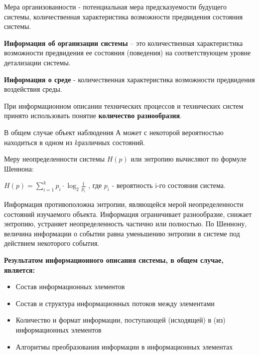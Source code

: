 \documentclass[a4paper]{article}
\begin{document}
Мера организованности - потенциальная мера предсказуемости будущего системы, количественная характеристика возможности предвидения состояния системы. 

\textbf{Информация об организации системы} – это количественная характеристика возможности предвидения ее состояния (поведения) на соответствующем уровне детализации системы.

\textbf{Информация о среде} - количественная характеристика возможности предвидения воздействия среды.


При информационном описании технических процессов и технических систем принято использовать понятие \textbf{количество разнообразия}.

В общем случае объект наблюдения  $ А $ может с некоторой вероятностью находиться в одном из $ k  $различных состояний.

Меру неопределенности системы $ H(p) $ или энтропию вычисляют по формуле Шеннона:

$ H(p) = \sum_{i=1}^{k}p_i \cdot \log_2 \frac{1}{p_i}$ , где $ p_i $ - вероятность i-го состояния система. 

Информация противоположна энтропии, являющейся мерой неопределенности состояний изучаемого объекта. Информация ограничивает разнообразие, снижает энтропию, устраняет неопределенность частично или полностью. По Шеннону, величина информации о событии равна уменьшению энтропии в системе под действием некоторого события.

\textbf{Результатом информационного описания системы, в общем случае, является:}
\begin{itemize}
	\item Состав информационных элементов
	\item Состав и структура информационных потоков между элементами
	\item Количество и формат информации, поступающей (исходящей) в (из) информационных элементов
	\item Алгоритмы преобразования информации в информационных элементах
\end{itemize}
\end{document}
